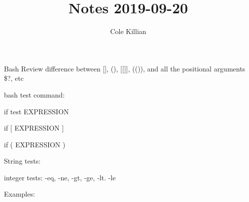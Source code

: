 \documentclass{article}
\begin{document}
\title{Notes 2019-09-20}
\author{Cole Killian}

\maketitle

Bash Review difference between [], (), [[]], (()), and all the positional arguments \$?, etc

bash test command:

if test EXPRESSION

if [ EXPRESSION ]

if ( EXPRESSION )


String tests:

integer tests: -eq, -ne, -gt, -ge, -lt. -le

Examples: 
\end{document}
